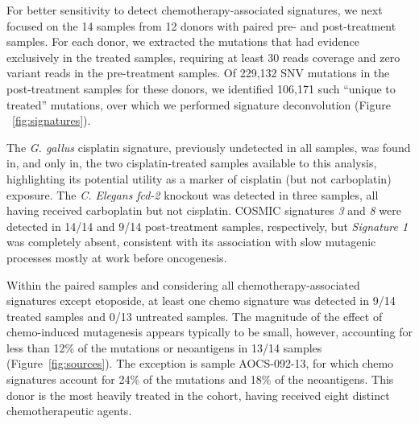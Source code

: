 For better sensitivity to detect chemotherapy-associated signatures, we next focused on the 14 samples from 12 donors with paired pre- and post-treatment samples. For each donor, we extracted the mutations that had evidence exclusively in the treated samples, requiring at least 30 reads coverage and zero variant reads in the pre-treatment samples. Of 229,132 SNV mutations in the post-treatment samples for these donors, we identified 106,171 such ``unique to treated'' mutations, over which we performed signature deconvolution (Figure ~\ref{fig:signatures}).

The \textit{G. gallus} cisplatin signature, previously undetected in all samples, was found in, and only in, the two cisplatin-treated samples available to this analysis, highlighting its potential utility as a marker of cisplatin (but not carboplatin) exposure. The \textit{C. Elegans} \textit{fcd-2} knockout was detected in three samples, all having received carboplatin but not cisplatin. COSMIC signatures \textit{3} and \textit{8} were detected in 14/14 and 9/14 post-treatment samples, respectively, but \textit{Signature 1} was completely absent, consistent with its association with slow mutagenic processes mostly at work before oncogenesis.

Within the paired samples and considering all chemotherapy-associated signatures except etoposide, at least one chemo signature was detected in 9/14 treated samples and 0/13 untreated samples. The magnitude of the effect of chemo-induced mutagenesis appears typically to be small, however, accounting for less than 12\% of the mutations or neoantigens in 13/14 samples (Figure~\ref{fig:sources}). The exception is sample AOCS-092-13, for which chemo signatures account for 24\% of the mutations and 18\% of the neoantigens. This donor is the most heavily treated in the cohort, having received eight distinct chemotherapeutic agents.
